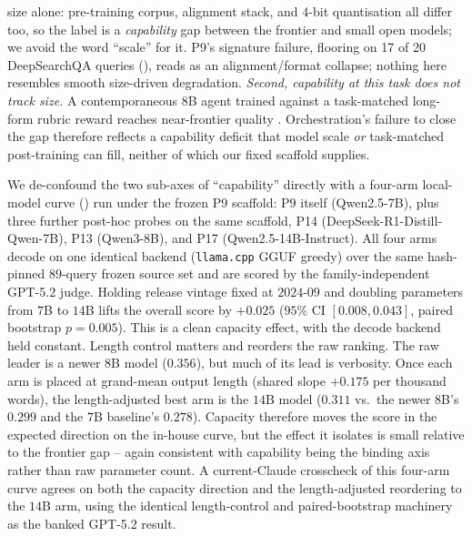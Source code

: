 \documentclass[11pt]{article}
\begin{document}
size alone: pre-training corpus, alignment stack, and 4-bit quantisation all differ too,
so the label is a \emph{capability} gap between the frontier and small open models; we
avoid the word ``scale'' for it. P9's signature failure, flooring on 17 of 20 DeepSearchQA queries
(), reads as an alignment/format collapse; nothing here resembles
smooth size-driven degradation. \emph{Second, capability at this task does not track
size.} A contemporaneous 8B agent trained against a task-matched long-form rubric reward
reaches near-frontier quality \citep{shao2025drtulu}. Orchestration's failure to close
the gap therefore reflects a capability deficit that model scale \emph{or} task-matched
post-training can fill, neither of which our fixed scaffold supplies.

We de-confound the two sub-axes of ``capability'' directly with a four-arm local-model
curve () run under the frozen P9 scaffold: P9 itself (Qwen2.5-7B),
plus three further post-hoc probes on the same scaffold, P14 (DeepSeek-R1-Distill-Qwen-7B),
P13 (Qwen3-8B), and P17 (Qwen2.5-14B-Instruct). All four arms decode on one
identical backend (\texttt{llama.cpp} GGUF greedy) over the same hash-pinned $89$-query
frozen source set and are scored by the family-independent GPT-5.2 judge. Holding
release vintage fixed at $2024$-$09$ and doubling parameters from $7$B to $14$B lifts
the overall score by $+0.025$ ($95\%$ CI $[0.008, 0.043]$, paired bootstrap
$p{=}0.005$). This is a clean capacity effect, with the decode backend held constant.
Length control matters and reorders the raw ranking. The raw leader is a newer $8$B
model ($0.356$), but much of its lead is verbosity. Once each arm is placed at
grand-mean output length (shared slope $+0.175$ per thousand words), the length-adjusted
best arm is the $14$B model ($0.311$ vs.\ the newer $8$B's $0.299$ and the $7$B
baseline's $0.278$). Capacity therefore moves the score in the expected direction on the
in-house curve, but the effect it isolates is small relative to the frontier gap -- again
consistent with capability being the binding axis rather than raw parameter count. A
current-Claude crosscheck of this four-arm curve agrees on both the capacity direction and
the length-adjusted reordering to the $14$B arm, using the identical length-control and
paired-bootstrap machinery as the banked GPT-5.2 result.
\end{document}
